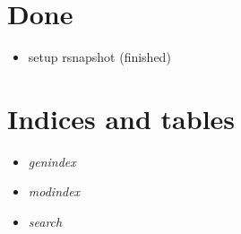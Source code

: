 \documentclass[letterpaper,10pt,english]{sphinxmanual}
\begin{document}
\chapter{Done}
\label{index:done}\begin{itemize}
\item {} 
setup rsnapshot (finished)

\end{itemize}


\chapter{Indices and tables}
\label{index:indices-and-tables}\begin{itemize}
\item {} 
\emph{genindex}

\item {} 
\emph{modindex}

\item {} 
\emph{search}

\end{itemize}



\renewcommand{\indexname}{Index}
\printindex
\end{document}
